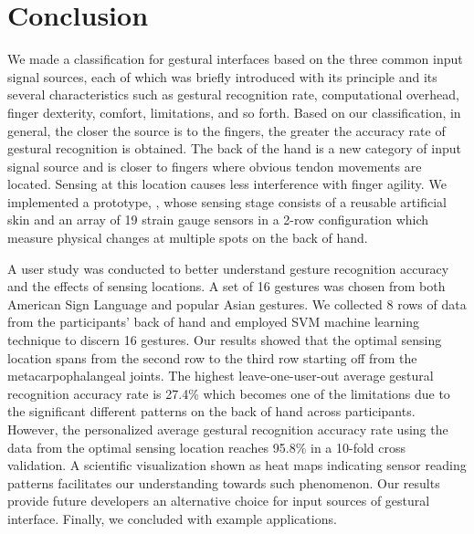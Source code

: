 \documentclass{sigchi}
\begin{document}
\section{Conclusion}
We made a classification for gestural interfaces based on the three common input signal sources, each of which was briefly introduced with its principle and its several characteristics such as gestural recognition rate, computational overhead, finger dexterity, comfort, limitations, and so forth. Based on our classification, in general, the closer the source is to the fingers, the greater the accuracy rate of gestural recognition is obtained.
The back of the hand is a new category of input signal source and is closer to fingers where obvious tendon movements are located. Sensing at this location causes less interference with finger agility. We implemented a prototype, \getTitleName, whose sensing stage consists of a reusable artificial skin and an array of 19 strain gauge sensors in a 2-row configuration which measure physical changes at multiple spots on the back of hand.

A user study was conducted to better understand gesture recognition accuracy and the effects of sensing locations. A set of 16 gestures was chosen from both American Sign Language and popular Asian gestures. We collected 8 rows of data from the participants' back of hand and employed SVM machine learning technique to discern 16 gestures. Our results showed that the optimal sensing location spans from the second row to the third row starting off from the metacarpophalangeal joints. The highest leave-one-user-out average gestural recognition accuracy rate is 27.4\% which becomes one of the limitations due to the significant different patterns on the back of hand across participants. However, the personalized average gestural recognition accuracy rate using the data from the optimal sensing location reaches 95.8\% in a 10-fold cross validation. A scientific visualization shown as heat maps indicating sensor reading patterns facilitates our understanding towards such phenomenon.
Our results provide future developers an alternative choice for input sources of gestural interface. Finally, we concluded with example applications.

\end{document}
